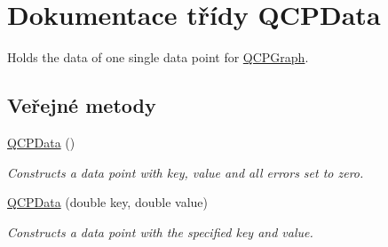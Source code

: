 \hypertarget{classQCPData}{}\section{Dokumentace třídy Q\+C\+P\+Data}
\label{classQCPData}


Holds the data of one single data point for \hyperlink{classQCPGraph}{Q\+C\+P\+Graph}.  


\subsection*{Veřejné metody}
\begin{DoxyCompactItemize}
\item 
\hypertarget{classQCPData_a1f06d624e36ba0ed72ac36d42aa5c7ee}{}\hyperlink{classQCPData_a1f06d624e36ba0ed72ac36d42aa5c7ee}{Q\+C\+P\+Data} ()\label{classQCPData_a1f06d624e36ba0ed72ac36d42aa5c7ee}

\begin{DoxyCompactList}\small\item\em Constructs a data point with key, value and all errors set to zero. \end{DoxyCompactList}\item 
\hyperlink{classQCPData_aa274181ae8de2a0907ba5464d3c2c103}{Q\+C\+P\+Data} (double key, double value)
\begin{DoxyCompactList}\small\item\em Constructs a data point with the specified {\itshape key} and {\itshape value}. \end{DoxyCompactList}\end{DoxyCompactItemize}
